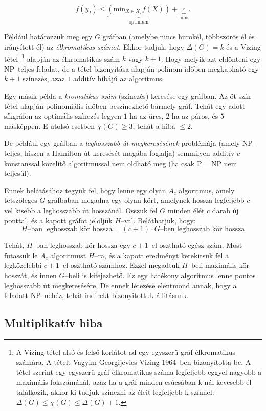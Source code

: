 \[
f(y_I) \leq \underbrace{(\mbox{min}_{X \in X_I} f(X))}_{\mbox{optimum}} +
\underbrace{c}_{\mbox{hiba}}.
\]

Például  határozzuk meg egy $G$ gráfban (amelybe nincs hurokél, többszörös él és
irányított él) az \emph{élkromatikus számot}. Ekkor tudjuk, hogy $\Delta(G)=k$ és a
Vizing tétel~\footnote{A Vizing-tétel alsó és felső korlátot ad egy egyszerű
gráf élkromatikus számára. A tételt Vagyim Georgijevics Vizing 1964--ben
bizonyította be. A tétel szerint egy egyszerű gráf élkromatikus száma legfeljebb
eggyel nagyobb a maximális fokszámánál, azaz ha a gráf minden csúcsában k-nál
kevesebb él találkozik, akkor ki tudjuk színezni az éleit legfeljebb k színnel:
$\Delta(G) \leq \chi(G) \leq \Delta(G)+1.$}
alapján az élkromatikus szám $k$ vagy $k+1$. Hogy melyik azt
eldönteni egy NP--teljes feladat, de a tétel bizonyítása alapján polinom időben
megkapható egy $k+1$ színezés, azaz $1$ additív hibájú az algoritmus.

Egy másik példa a \emph{kromatikus szám} (színezés) keresése egy gráfban. Az öt szín
tétel alapján polinomiális időben beszínezhető bármely gráf. Tehát egy adott
síkgráfon az optimális színezés legyen $1$ ha az üres, $2$ ha az páros, és $5$
másképpen. E utolsó esetben $\chi(G) \geq 3$, tehát a hiba $\leq 2$.

De például egy gráfban a \emph{leghosszabb út megkeresésének} problémája (amely
NP-teljes, hiszen a Hamilton-út keresését magába foglalja) semmilyen additív $c$
konstanssal közelítő algoritmussal nem oldható meg (ha csak P$=$NP nem
teljesül). 

Ennek belátásához tegyük fel, hogy lenne egy olyan $A_c$ algoritmus, amely
tetszőleges $G$ gráfbaban megadna egy olyan kört, amelynek hossza legfeljebb
$c$--vel kisebb a leghosszabb út hosszánál. Osszuk fel $G$ minden élét $c$ darab
új ponttal, és a kapott gráfot jelöljük $H$--val. Beláthatjuk, hogy:
\[ H\mbox{--ban leghosszab kör hossza} = (c+1) \cdot G\mbox{--ben leghosszab
kör hossza} \]

Tehát, $H$--ban leghosszab kör hossza egy $c+1$--el osztható egész szám.  Most
futassuk le $A_c$ algoritmust $H$--ra, és a kapott eredményt kerekitsük fel a
legközelebbi $c+1$--el osztható számhoz. Ezzel megadtuk $H$--beli maximális kör
hosszát, és innen $G$--beli is kifejezhető. Ez egy hatékony algoritmus lenne
pontos leghosszabb út megkeresésére. De ennek létezése elentmond annak, hogy a
feladatt NP--nehéz, tehát indirekt bizonyitottuk állitásunk.

\subsection{Multiplikatív hiba}

